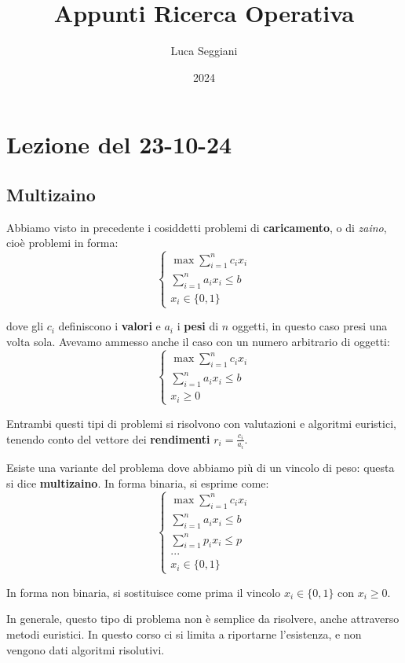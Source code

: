 \documentclass[a4paper,11pt]{article}
\title{Appunti Ricerca Operativa}
\author{Luca Seggiani}
\date{2024}
\begin{document}
\section{Lezione del 23-10-24}

\thispagestyle{empty}
\pagestyle{fancy}

\subsection{Multizaino}
Abbiamo visto in precedente i cosiddetti problemi di \textbf{caricamento}, o di \textit{zaino}, cioè problemi in forma:
\[
	\begin{cases}
		\max \sum_{i=1}^n c_i x_i \\ 
		\sum_{i=1}^n a_i x_i \leq b \\ 
		x_i \in \{ 0, 1 \}
	\end{cases}
\]

dove gli $c_i$ definiscono i \textbf{valori} e $a_i$ i \textbf{pesi} di $n$ oggetti, in questo caso presi una volta sola.
Avevamo ammesso anche il caso con un numero arbitrario di oggetti:
\[
	\begin{cases}
		\max \sum_{i=1}^n c_i x_i \\ 
		\sum_{i=1}^n a_i x_i \leq b \\ 
		x_i \geq 0
	\end{cases}
\]

Entrambi questi tipi di problemi si risolvono con valutazioni e algoritmi euristici, tenendo conto del vettore dei \textbf{rendimenti} $r_i = \frac{c_i}{a_i}$.

Esiste una variante del problema dove abbiamo più di un vincolo di peso: questa si dice \textbf{multizaino}.
In forma binaria, si esprime come:
\[
	\begin{cases}	
		\max \sum_{i=1}^n c_i x_i \\ 
		\sum_{i=1}^n a_i x_i \leq b \\ 
		\sum_{i=1}^n p_i x_i \leq p \\
		... \\ 
		x_i \in \{ 0, 1 \}
	\end{cases}
\]

In forma non binaria, si sostituisce come prima il vincolo $x_i \in \{ 0, 1 \}$ con $x_i \geq 0$.

In generale, questo tipo di problema non è semplice da risolvere, anche attraverso metodi euristici.
In questo corso ci si limita a riportarne l'esistenza, e non vengono dati algoritmi risolutivi.
\end{document}
